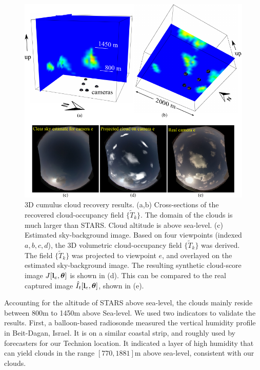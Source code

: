 \documentclass[runningheads]{llncs}
\begin{document}
\begin{figure}[t!]
\begin{center}
   \includegraphics[width=1\linewidth]{figures/clouds_reconstructions.pdf}
\end{center}
   \vspace{-0.6cm}
   \caption{3D cumulus cloud recovery results. (a,b) Cross-sections of the recovered cloud-occupancy field $\{\tilde T_k\}$. The domain of the clouds is much larger than STARS. Cloud
   altitude is above sea-level. (c) Estimated sky-background image.  Based on four viewpoints (indexed $a,b,c,d$), the 3D volumetric cloud-occupancy field $\{\tilde T_k\}$ was derived. The field $\{\tilde T_k\}$ was projected to viewpoint $e$, and overlayed on the estimated sky-background image. The resulting synthetic cloud-score image $J[{\bf l}_e,{\bm \theta}]$ is shown in (d). This can be compared to the real captured image $\hat I_t[{\bf l}_e,{\bm \theta}]$, shown in (e).}
\label{fig:projection}
\end{figure}
Accounting for the altitude of STARS above sea-level, the clouds mainly reside between 800m to 1450m above Sea-level. We used two indicators to validate the results. First, a balloon-based radiosonde measured the vertical humidity profile in Beit-Dagan, Israel. It is on a similar coastal strip, and roughly used by forecasters for our Technion location. It indicated a layer of high humidity that can yield clouds in the range $[770,1881]$m above sea-level, consistent with our clouds.
\end{document}
